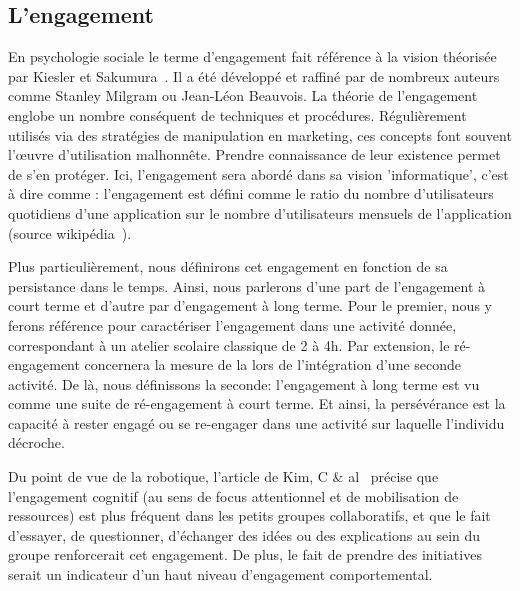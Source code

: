     \subsection{L'engagement}
        En psychologie sociale le terme d'engagement fait référence à la vision théorisée par Kiesler et Sakumura~. Il a été développé et raffiné par de nombreux auteurs comme Stanley Milgram ou Jean-Léon Beauvois. La théorie de l'engagement englobe un nombre conséquent de techniques et procédures. Régulièrement utilisés via des stratégies de manipulation en marketing, ces concepts font souvent l’œuvre d'utilisation malhonnête. Prendre connaissance de leur existence permet de s'en protéger.
        Ici, l'engagement sera abordé dans sa vision 'informatique', c'est à dire comme : l'engagement est défini comme le ratio du nombre d'utilisateurs quotidiens d'une application sur le nombre d'utilisateurs mensuels de l'application (source wikipédia~).\par%
        Plus particulièrement, nous définirons cet engagement en fonction de sa persistance dans le temps. Ainsi, nous parlerons d'une part de l'engagement à court terme et d'autre par d'engagement à long terme.
        Pour le premier, nous y ferons référence pour caractériser l'engagement dans une activité donnée, correspondant à un atelier scolaire classique de 2 à 4h. Par extension, le ré-engagement concernera la mesure de la  lors de l'intégration d'une seconde activité. De là, nous définissons la seconde: l'engagement à long terme est vu comme une suite de ré-engagement à court terme. Et ainsi, la persévérance est la capacité à rester engagé ou se re-engager dans une activité sur laquelle l'individu décroche.\par%
        Du point de vue de la robotique, l’article de Kim, C \& al~ précise que l’engagement cognitif (au sens de focus attentionnel et de mobilisation de ressources) est plus fréquent dans les petits groupes collaboratifs, et que le fait d’essayer, de questionner, d’échanger des idées ou des explications au sein du groupe renforcerait cet engagement. De plus, le fait de prendre des initiatives serait un indicateur d’un haut niveau d’engagement comportemental.
